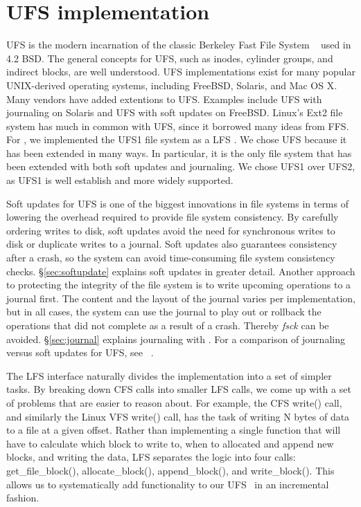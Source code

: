 \section{UFS implementation}
\label{sec:ufs}

UFS is the modern incarnation of the classic Berkeley Fast File System
~\cite{mckusick84fast} used in 4.2 BSD. The general concepts for UFS, such as
inodes, cylinder groups, and indirect blocks, are well understood. UFS
implementations exist for many popular UNIX-derived operating systems,
including FreeBSD, Solaris, and Mac OS X. Many vendors have added extentions
to UFS. Examples include UFS with journaling on Solaris and UFS with soft
updates on FreeBSD. Linux's Ext2 file system has much in common with UFS,
since it borrowed many ideas from FFS. For \Kudos, we implemented the UFS1
file system as a LFS \module. We chose UFS because it has been extended in
many ways. In particular, it is the only file system that has been extended
with both soft updates and journaling. We chose UFS1 over UFS2, as UFS1 is
well establish and more widely supported.

Soft updates for UFS is one of the biggest innovations in file systems in
terms of lowering the overhead required to provide file system consistency.
By carefully ordering writes to disk, soft updates avoid the need for
synchronous writes to disk or duplicate writes to a journal. Soft updates also
guarantees consistency after a crash, so the system can avoid time-consuming
file system consistency checks. \S\ref{sec:softupdate} explains soft updates
in greater detail.
Another approach to protecting the integrity of the file system is to write
upcoming operations to a journal first. The content and the layout of the
journal varies per implementation, but in all cases, the system can use the
journal to play out or rollback the operations that did not complete as a
result of a crash. Thereby \emph{fsck} can be avoided. \S\ref{sec:journal}
explains journaling with \chdescs.
For a comparison of journaling versus soft updates for UFS, see
~\cite{seltzer00journaling}.

The LFS interface naturally divides the implementation into a set of simpler
tasks. By breaking down CFS calls into smaller LFS calls, we come up with a
set of problems that are easier to reason about. For example, the CFS write()
call, and similarly the Linux VFS write() call, has the task of writing N
bytes of data to a file at a given offset. Rather than implementing a single
function that will have to calculate which block to write to, when to
allocated and append new blocks, and writing the data, LFS separates the
logic into four calls:
get\_file\_block(), allocate\_block(), append\_block(), and write\_block().
This allows us to systematically add functionality to our UFS \module\ in
an incremental fashion.

